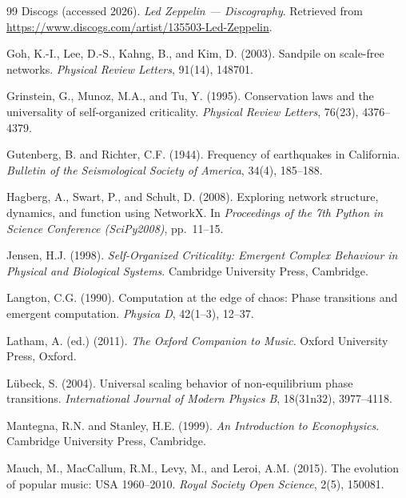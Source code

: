 \documentclass[12pt, a4paper]{article}
\begin{document}
\begin{thebibliography}{99}
Discogs (accessed 2026).
\textit{Led Zeppelin --- Discography}.
Retrieved from
\url{https://www.discogs.com/artist/135503-Led-Zeppelin}.

Goh, K.-I., Lee, D.-S., Kahng, B., and Kim, D. (2003).
Sandpile on scale-free networks.
\textit{Physical Review Letters}, 91(14), 148701.

Grinstein, G., Munoz, M.A., and Tu, Y. (1995).
Conservation laws and the universality of self-organized
criticality.
\textit{Physical Review Letters}, 76(23), 4376--4379.

Gutenberg, B. and Richter, C.F. (1944).
Frequency of earthquakes in California.
\textit{Bulletin of the Seismological Society of America},
34(4), 185--188.

Hagberg, A., Swart, P., and Schult, D. (2008).
Exploring network structure, dynamics, and function using NetworkX.
In \textit{Proceedings of the 7th Python in Science Conference
(SciPy2008)}, pp.\ 11--15.

Jensen, H.J. (1998).
\textit{Self-Organized Criticality: Emergent Complex Behaviour in
Physical and Biological Systems}.
Cambridge University Press, Cambridge.

Langton, C.G. (1990).
Computation at the edge of chaos: Phase transitions and emergent
computation.
\textit{Physica D}, 42(1--3), 12--37.

Latham, A. (ed.) (2011).
\textit{The Oxford Companion to Music}.
Oxford University Press, Oxford.

L\"ubeck, S. (2004).
Universal scaling behavior of non-equilibrium phase transitions.
\textit{International Journal of Modern Physics B},
18(31n32), 3977--4118.

Mantegna, R.N. and Stanley, H.E. (1999).
\textit{An Introduction to Econophysics}.
Cambridge University Press, Cambridge.

Mauch, M., MacCallum, R.M., Levy, M., and Leroi, A.M. (2015).
The evolution of popular music: USA 1960--2010.
\textit{Royal Society Open Science}, 2(5), 150081.


\end{thebibliography}
\end{document}
